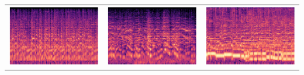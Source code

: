 \documentclass[a4paper,10pt]{article}
\begin{document}
\begin{table}[!ht]
    \centering
    \begin{tabular}{ccc}
        \includegraphics[scale=0.3]{blues.png} &  \includegraphics[scale=0.3]{classical.png} & \includegraphics[scale=0.3]{country.png}\\ 

\end{tabular}
\end{table}
\end{document}
